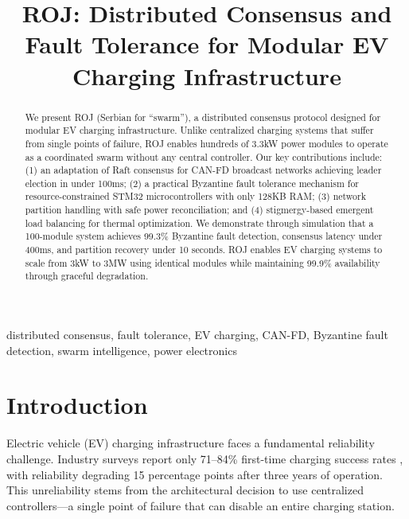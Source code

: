 \documentclass[conference,10pt]{IEEEtran}
\begin{document}
\title{ROJ: Distributed Consensus and Fault Tolerance for Modular EV Charging Infrastructure}

\author{
}

\maketitle

\begin{abstract}
We present ROJ (Serbian for ``swarm''), a distributed consensus protocol designed for modular EV charging infrastructure. Unlike centralized charging systems that suffer from single points of failure, ROJ enables hundreds of 3.3kW power modules to operate as a coordinated swarm without any central controller. Our key contributions include: (1) an adaptation of Raft consensus for CAN-FD broadcast networks achieving leader election in under 100ms; (2) a practical Byzantine fault tolerance mechanism for resource-constrained STM32 microcontrollers with only 128KB RAM; (3) network partition handling with safe power reconciliation; and (4) stigmergy-based emergent load balancing for thermal optimization. We demonstrate through simulation that a 100-module system achieves 99.3\% Byzantine fault detection, consensus latency under 400ms, and partition recovery under 10 seconds. ROJ enables EV charging systems to scale from 3kW to 3MW using identical modules while maintaining 99.9\% availability through graceful degradation.
\end{abstract}

\begin{IEEEkeywords}
distributed consensus, fault tolerance, EV charging, CAN-FD, Byzantine fault detection, swarm intelligence, power electronics
\end{IEEEkeywords}

\section{Introduction}

Electric vehicle (EV) charging infrastructure faces a fundamental reliability challenge. Industry surveys report only 71--84\% first-time charging success rates \cite{jdpower2025}, with reliability degrading 15 percentage points after three years of operation. This unreliability stems from the architectural decision to use centralized controllers---a single point of failure that can disable an entire charging station.
\end{document}
